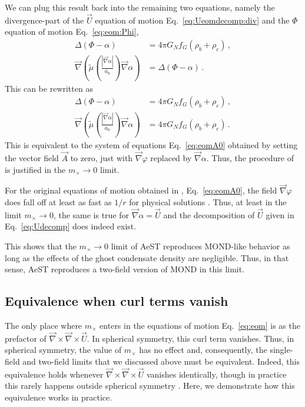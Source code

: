 \documentclass[reprint, amsmath,amssymb, nofootinbib, aps, prd]{revtex4-2}
\begin{document}
We can plug this result back into the remaining two equations, namely the divergence-part of the $\vec{U}$ equation of motion Eq.~\eqref{eq:Ueomdecomp:div} and the $\Phi$ equation of motion Eq.~\eqref{eq:eom:Phi},
\begin{subequations}
\begin{align}
 \Delta (\Phi - \alpha) &= 4 \pi G_N f_G (\rho_b + \rho_c) \,, \\
 \vec{\nabla} \left( \tilde{\mu}\left(\frac{|\vec{\nabla} \alpha|}{a_0}\right) \vec{\nabla} \alpha \right) &= \Delta (\Phi - \alpha) \,.
\end{align}
\end{subequations}
This can be rewritten as
\begin{subequations}
\label{eq:eomtwo}
\begin{align}
 \Delta (\Phi - \alpha) &= 4 \pi G_N f_G (\rho_b + \rho_c) \,, \\
 \vec{\nabla} \left( \tilde{\mu}\left(\frac{|\vec{\nabla} \alpha|}{a_0}\right) \vec{\nabla} \alpha \right) &= 4 \pi G_N f_G (\rho_b + \rho_c) \,.
\end{align}
\end{subequations}
This is equivalent to the system of equations Eq.~\eqref{eq:eomA0} obtained by setting the vector field $\vec{A}$ to zero, just with $\vec{\nabla} \varphi$ replaced by $\vec{\nabla} \alpha$.
Thus, the procedure of \cite{Skordis2020} is justified in the $m_\times \to 0$ limit.

For the original equations of motion obtained in \cite{Skordis2020}, Eq.~\eqref{eq:eomA0}, the field $\vec{\nabla} \varphi$ does fall off at least as fast as $1/r$ for physical solutions \citep{Skordis2020, Mistele2023}.
Thus, at least in the limit $m_\times \to 0$, the same is true for $\vec{\nabla} \alpha = \vec{U}$ and the decomposition of $\vec{U}$ given in Eq.~\eqref{eq:Udecomp} does indeed exist.

This shows that the $m_\times \to 0$ limit of AeST reproduces MOND-like behavior as long as the effects of the ghost condensate density are negligible.
Thus, in that sense, AeST reproduces a two-field version of MOND in this limit.

\subsection{Equivalence when curl terms vanish}
\label{sec:algebraic}

The only place where $m_\times$ enters in the equations of motion Eq.~\eqref{eq:eom} is as the prefactor of $\vec{\nabla} \times \vec{\nabla} \times \vec{U}$.
In spherical symmetry, this curl term vanishes.
Thus, in spherical symmetry, the value of $m_\times$ has no effect and, consequently, the single-field and two-field limits that we discussed above must be equivalent.
Indeed, this equivalence holds whenever $\vec{\nabla} \times \vec{\nabla} \times \vec{U}$ vanishes identically, though in practice this rarely happens outside spherical symmetry \citep{Brada1995}.
Here, we demonstrate how this equivalence works in practice.
\end{document}
